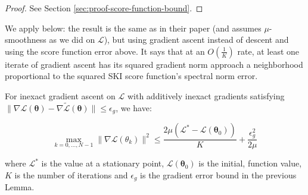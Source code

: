 
\begin{proof}
See Section \ref{sec:proof-score-function-bound}.
\end{proof}

We apply \cite{stonyakin2023stopping} below: the result is the same as in their paper (and assumes $\mu$-smoothness as we did on $\mathcal{L}$), but using gradient ascent instead of descent and using the score function error above. It says that at an $O\left(\frac{1}{K}\right)$ rate, at least one iterate of gradient ascent has its squared gradient norm approach a neighborhood proportional to the squared SKI score function's spectral norm error.

\begin{theorem} \citep{stonyakin2023stopping}
    For inexact gradient ascent on $\mathcal{L}$ with additively inexact gradients satisfying $\|\nabla \mathcal{L}(\boldsymbol{\theta}) - \nabla \tilde{\mathcal{L}}(\boldsymbol{\theta})\| \leq \epsilon_g$, we have:

\begin{equation}
    \max_{k=0,...,N-1} \|\nabla \mathcal{L}(\theta_k)\|^2 \leq \frac{2\mu(\mathcal{L}^* - \mathcal{L}(\boldsymbol{\theta}_0))}{K} + \frac{\epsilon_g^2}{2\mu}
\end{equation}

where $\mathcal{L}^*$ is the value at a stationary point, $\mathcal{L}(\boldsymbol{\theta}_0)$ is the initial, function value, $K$ is the number of iterations and $\epsilon_g$ is the gradient error bound in the previous Lemma.

\end{theorem}


